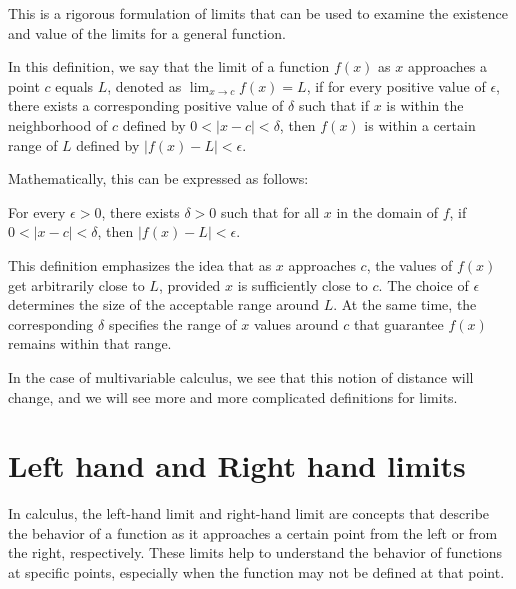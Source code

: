 This is a rigorous formulation of limits that can be used to examine the existence and value of the limits for a general function. 

In this definition, we say that the limit of a function \( f(x) \) as \( x \) approaches a point \( c \) equals \( L \), denoted as \( \lim_{x \to c} f(x) = L \), if for every positive value of \( \epsilon \), there exists a corresponding positive value of \( \delta \) such that if \( x \) is within the neighborhood of \( c \) defined by \( 0 < |x - c| < \delta \), then \( f(x) \) is within a certain range of \( L \) defined by \( |f(x) - L| < \epsilon \).

Mathematically, this can be expressed as follows:

\begin{outline}
For every \( \epsilon > 0 \), there exists \( \delta > 0 \) such that for all \( x \) in the domain of \( f \), if \( 0 < |x - c| < \delta \), then \( |f(x) - L| < \epsilon \).
\end{outline}

This definition emphasizes the idea that as \( x \) approaches \( c \), the values of \( f(x) \) get arbitrarily close to \( L \), provided \( x \) is sufficiently close to \( c \). The choice of \( \epsilon \) determines the size of the acceptable range around \( L \). At the same time, the corresponding \( \delta \) specifies the range of \( x \) values around \( c \) that guarantee \( f(x) \) remains within that range.


In the case of multivariable calculus, we see that this notion of distance will change, and we will see more and more complicated definitions for limits. 

\section{Left hand and Right hand limits}
In calculus, the left-hand limit and right-hand limit are concepts that describe the behavior of a function as it approaches a certain point from the left or from the right, respectively. These limits help to understand the behavior of functions at specific points, especially when the function may not be defined at that point.

